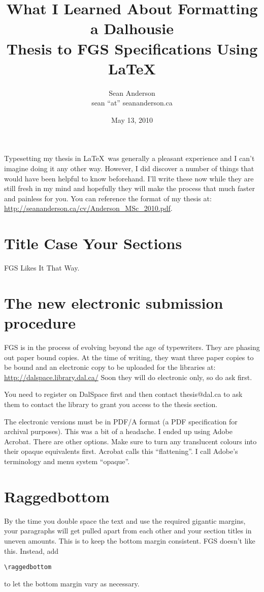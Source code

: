 \documentclass[12pt]{article}
\title{What I Learned About Formatting a Dalhousie\\ Thesis to FGS Specifications Using \LaTeX}
\author{Sean Anderson\\sean ``at'' seananderson.ca}
\date{May 13, 2010}
\begin{document}
\maketitle
\tableofcontents
\setlength{\parskip}{1.9mm}

\bigskip
\bigskip

Typesetting my thesis in \LaTeX~was generally a pleasant experience and I can't imagine doing it any other way. However, I did discover a number of things that would have been helpful to know beforehand. I'll write these now while they are still fresh in my mind and hopefully they will make the process that much faster and painless for you. You can reference the format of my thesis at:\\
\url{http://seananderson.ca/cv/Anderson_MSc_2010.pdf}.

\section{Title Case Your Sections}
FGS Likes It That Way.

\section{The new electronic submission procedure}
FGS is in the process of evolving beyond the age of typewriters. They are phasing out paper bound copies. At the time of writing, they want three paper copies to be bound and an electronic copy to be uploaded for the libraries at: \url{http://dalspace.library.dal.ca/}
Soon they will do electronic only, so do ask first.

You need to register on DalSpace first and then contact thesis@dal.ca to ask them to contact the library to grant you access to the thesis section.

The electronic versions must be in PDF/A format (a PDF specification for archival purposes). This was a bit of a headache. I ended up using Adobe Acrobat. There are other options. Make sure to turn any translucent colours into their opaque equivalents first. Acrobat calls this ``flattening''. I call Adobe's terminology and menu system ``opaque''.

\section{Raggedbottom}
By the time you double space the text and use the required gigantic margins, your paragraphs will get pulled apart from each other and your section titles in uneven amounts. This is to keep the bottom margin consistent. FGS doesn't like this. Instead, add 
\begin{verbatim}
\raggedbottom
\end{verbatim}
to let the bottom margin vary as necessary.
\end{document}
